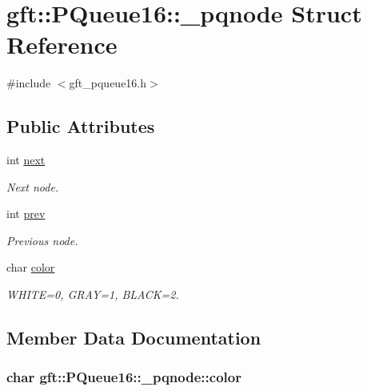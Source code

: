 \hypertarget{structgft_1_1PQueue16_1_1__pqnode}{}\section{gft\+:\+:P\+Queue16\+:\+:\+\_\+pqnode Struct Reference}
\label{structgft_1_1PQueue16_1_1__pqnode}


{\ttfamily \#include $<$gft\+\_\+pqueue16.\+h$>$}

\subsection*{Public Attributes}
\begin{DoxyCompactItemize}
\item 
int \hyperlink{structgft_1_1PQueue16_1_1__pqnode_ae134e5ac0719e6f167a30bc0f6db8c82}{next}
\begin{DoxyCompactList}\small\item\em Next node. \end{DoxyCompactList}\item 
int \hyperlink{structgft_1_1PQueue16_1_1__pqnode_a3f2d4b2b31360fd45e1f61cde5ebec41}{prev}
\begin{DoxyCompactList}\small\item\em Previous node. \end{DoxyCompactList}\item 
char \hyperlink{structgft_1_1PQueue16_1_1__pqnode_a8dbd4c180d9f604dbf1ec338a32a49af}{color}
\begin{DoxyCompactList}\small\item\em W\+H\+I\+TE=0, G\+R\+AY=1, B\+L\+A\+CK=2. \end{DoxyCompactList}\end{DoxyCompactItemize}


\subsection{Member Data Documentation}
\subsubsection[{\texorpdfstring{color}{color}}]{\setlength{\rightskip}{0pt plus 5cm}char gft\+::\+P\+Queue16\+::\+\_\+pqnode\+::color}\hypertarget{structgft_1_1PQueue16_1_1__pqnode_a8dbd4c180d9f604dbf1ec338a32a49af}{}\label{structgft_1_1PQueue16_1_1__pqnode_a8dbd4c180d9f604dbf1ec338a32a49af}


